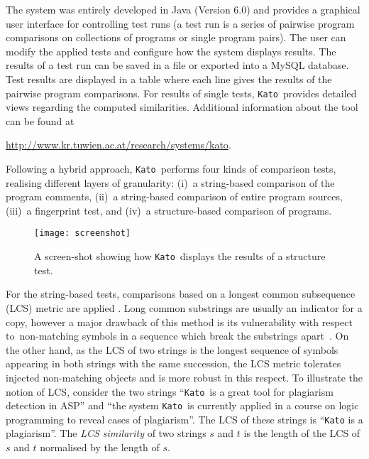 \documentclass{tlp}
\newcommand{\wrt}[0]{with respect to}
\newcommand{\kato}[0]{\texttt{Kato}\xspace}
\begin{document}
The system was entirely developed in Java (Version 6.0) and
 provides a {graphical user interface} for controlling
test runs (a test run is a  series of pairwise program comparisons on collections of programs or single program pairs).
The user can modify the applied tests and configure how the system displays results. 
The results of a test run can be saved in a file or exported into a MySQL database.
Test results  are displayed in a table where each line gives the results of  the pairwise program comparisons. For  results of single tests, \kato\ provides 
detailed views regarding the computed similarities.
Additional information about the tool 
can  be found at
\begin{center}
\url{http://www.kr.tuwien.ac.at/research/systems/kato}.
\end{center}

Following a hybrid approach, \kato\ performs four kinds
of comparison tests, 
realising different layers of granularity:
(i)~a string-based comparison of the program comments, 
(ii)~a string-based comparison of entire program sources, 
(iii)~a fingerprint test, and 
(iv)~a structure-based comparison of  programs. 

\begin{figure}[t]
\begin{center}
\texttt{[image: screenshot]}
\end{center}
\caption{A screen-shot showing how \kato\ displays the results of  a structure test. }
\label{fig:screenshot}
\end{figure}


For the string-based tests, comparisons based on a {longest common subsequence} (LCS) metric are applied \cite{bergroth00}.
Long common substrings are usually an indicator for a copy, however a major drawback of this method is its vulnerability \wrt\  non-matching  symbols in a sequence which break the substrings apart~\cite{LBPS08}.
On the other hand, as the LCS of two strings is the longest sequence of symbols appearing in both strings with the same succession, the LCS metric tolerates injected non-matching objects and is more robust in this respect.
To illustrate the notion of LCS, consider the two strings
``\kato\ is a great tool for plagiarism detection in ASP'' and
``the system \kato\ is currently applied in a course on logic programming to reveal cases of plagiarism''.
The LCS of these strings is ``\kato is a plagiarism''.
The \emph{LCS similarity} of two strings $s$ and $t$ is the 
 length of the LCS of $s$ and $t$ normalised by the length of $s$.
\end{document}
